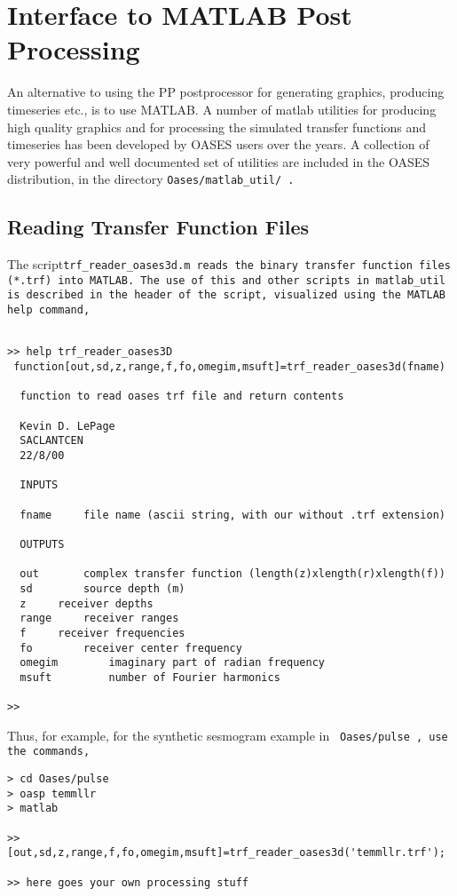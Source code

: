 \section{Interface to MATLAB Post Processing}

An alternative to using the PP postprocessor for generating graphics,
producing timeseries etc., is to use MATLAB. A number of matlab
utilities for producing high quality graphics and for processing the
simulated transfer functions and timeseries has been developed by
OASES users over the years. A collection of very powerful and well
documented set of utilities are included in
the OASES distribution, in the directory \tt Oases/matlab\_util/
\rm.

\subsection{Reading Transfer Function Files}

The script\tt trf\_reader\_oases3d.m \rm reads the binary
transfer function files \tt (*.trf) \rm into MATLAB. The use of this
and other scripts in \tt matlab\_util \rm is described in the header
of the script, visualized using the MATLAB \tt help \rm command,

\begin{verbatim}

>> help trf_reader_oases3D
 function[out,sd,z,range,f,fo,omegim,msuft]=trf_reader_oases3d(fname)
 
  function to read oases trf file and return contents
 
  Kevin D. LePage
  SACLANTCEN
  22/8/00
 
  INPUTS
 
  fname		file name (ascii string, with our without .trf extension)
 
  OUTPUTS
 
  out		complex transfer function (length(z)xlength(r)xlength(f))
  sd		source depth (m)
  z		receiver depths
  range		receiver ranges
  f		receiver frequencies
  fo		receiver center frequency
  omegim        imaginary part of radian frequency
  msuft         number of Fourier harmonics

>> 
\end{verbatim}

Thus, for example, for the synthetic sesmogram example in \tt
Oases/pulse \rm, use the commands,

\begin{verbatim}
> cd Oases/pulse
> oasp temmllr
> matlab

>>
[out,sd,z,range,f,fo,omegim,msuft]=trf_reader_oases3d('temmllr.trf');
  
>> here goes your own processing stuff
\end{verbatim}

